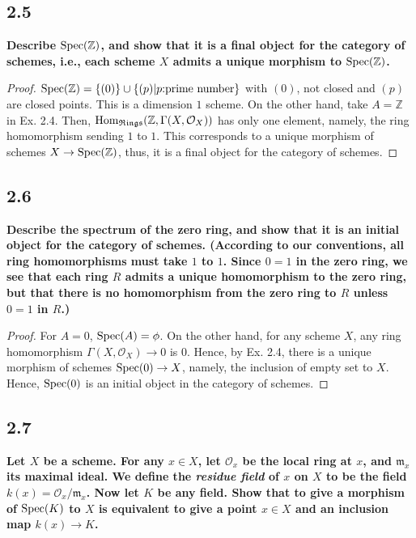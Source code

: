 \documentclass[11pt]{amsart}          %
\newcommand{\calO}{\mathcal{O}}
\newcommand{\spec}{{\rm Spec}}
\renewcommand{\hom}{{\rm Hom}}
\begin{document}
\subsection*{2.5}\textbf{Describe $\spec (\mathbb{Z})$, and show that it is a final object for the category of schemes, i.e., each scheme $X$ admits a unique morphism to $\spec (\mathbb{Z})$.}
\begin{proof} $\spec (\mathbb{Z}) = \{ (0) \} \cup \{ (p)| p \mbox{:prime number} \}$ with $(0)$, not closed and $(p)$ are closed points. This is a dimension $1$ scheme. On the other hand, take $A= \mathbb{Z}$ in Ex. 2.4. Then,
$\hom_{\mathfrak{Rings}} (\mathbb{Z}, \Gamma(X, \calO_X))$ has only one element, namely, the ring homomorphism sending $1$ to $1$. This corresponds to a unique morphism of schemes $X \to \spec (\mathbb{Z})$, thus, it is a final object for the category of schemes.\end{proof}

\subsection*{2.6} \textbf{Describe the spectrum of the zero ring, and show that it is an initial object for the category of schemes. (According to our conventions, all ring homomorphisms must take $1$ to $1$. Since $0 = 1$ in the zero ring, we see that each ring $R$ admits a unique homomorphism to the zero ring, but that there is no homomorphism from the zero ring to $R$ unless $0 = 1$ in $R$.)}

\begin{proof}For $A=0$, $\spec (A) = \phi$. On the other hand, for any scheme $X$, any ring homomorphism $\Gamma(X, \calO_X) \to 0$ is $0$. Hence, by Ex. 2.4, there is a unique morphism of schemes $\spec (0) \to X$, namely, the inclusion of empty set to $X$. Hence, $\spec (0)$ is an initial object in the category of schemes.\end{proof}

\subsection*{2.7} \textbf{Let $X$ be a scheme. For any $x \in X$, let $\calO_x$ be the local ring at $x$, and $\mathfrak{m}_x$ its maximal ideal. We define the {\it residue field} of $x$ on $X$ to be the field $k(x) = \calO_x / \mathfrak{m}_x$. Now let $K$ be any field. Show that to give a morphism of $\spec (K)$ to $X$ is equivalent to give a point $x \in X$ and an inclusion map $k(x) \to K$.}
\end{document}

